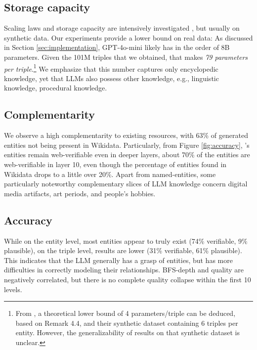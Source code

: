\subsection{Storage capacity}
Scaling laws and storage capacity are intensively investigated \cite{allen2024physics}, but usually on synthetic data. Our experiments provide a lower bound on real data: As discussed in Section \ref{sec:implementation}, GPT-4o-mini likely has in the order of 8B parameters. Given the 101M triples that we obtained, that makes \textit{79 parameters per triple}.\footnote{From \cite{allen2024physics}, a theoretical lower bound of 4 parameters/triple can be deduced, based on Remark 4.4, and their synthetic dataset containing 6 triples per entity. However, the generalizability of results on that synthetic dataset is unclear.} We emphasize that this number captures only encyclopedic knowledge, yet that LLMs also possess other knowledge, e.g., linguistic knowledge, procedural knowledge. 



\subsection{Complementarity} We observe a high complementarity to existing resources, with 63\% 
of generated entities not being present in Wikidata. Particularly, from Figure \ref{fig:accuracy}, \ourkb's entities remain web-verifiable even in deeper layers, about 70\% of the entities are web-verifiable in layer 10, even though the percentage of entities found in Wikidata drops to a little over 20\%.
Apart from named-entities, some particularly noteworthy complementary slices of LLM knowledge concern digital media artifacts, art periods, and people's hobbies.

\subsection{Accuracy}
While on the entity level, most entities appear to truly exist (74\% verifiable, 9\% plausible), on the triple level, results are lower (31\% verifiable, 61\% plausible). This indicates that the LLM generally has a grasp of entities, but has more difficulties in correctly modeling their relationships. BFS-depth and quality are negatively correlated, but there is no complete quality collapse within the first 10 levels. 

